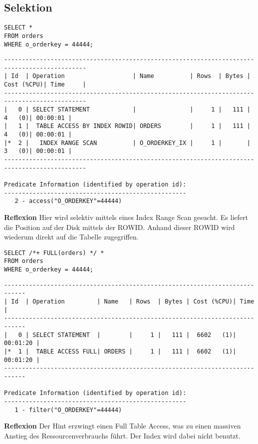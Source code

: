 \documentclass[10pt]{article}
\begin{document}
\subsection{Selektion}
\begin{lstlisting}[style=sql]
SELECT *
FROM orders
WHERE o_orderkey = 44444;
\end{lstlisting}
\begin{lstlisting}[style=queryexecutionplan]
---------------------------------------------------------------------------------------------
| Id  | Operation                   | Name          | Rows  | Bytes | Cost (%CPU)| Time     |
---------------------------------------------------------------------------------------------
|   0 | SELECT STATEMENT            |               |     1 |   111 |     4   (0)| 00:00:01 |
|   1 |  TABLE ACCESS BY INDEX ROWID| ORDERS        |     1 |   111 |     4   (0)| 00:00:01 |
|*  2 |   INDEX RANGE SCAN          | O_ORDERKEY_IX |     1 |       |     3   (0)| 00:00:01 |
---------------------------------------------------------------------------------------------

Predicate Information (identified by operation id):
---------------------------------------------------
   2 - access("O_ORDERKEY"=44444)
\end{lstlisting}
\textbf{Reflexion} \newline
Hier wird selektiv mittels eines Index Range Scan gesucht. Es liefert die Position auf der Disk mittels der ROWID. Anhand dieser ROWID wird wiederum direkt auf die Tabelle zugegriffen.

\begin{lstlisting}[style=sql]
SELECT /*+ FULL(orders) */ *
FROM orders
WHERE o_orderkey = 44444;
\end{lstlisting}
\begin{lstlisting}[style=queryexecutionplan]
----------------------------------------------------------------------------
| Id  | Operation         | Name   | Rows  | Bytes | Cost (%CPU)| Time     |
----------------------------------------------------------------------------
|   0 | SELECT STATEMENT  |        |     1 |   111 |  6602   (1)| 00:01:20 |
|*  1 |  TABLE ACCESS FULL| ORDERS |     1 |   111 |  6602   (1)| 00:01:20 |
----------------------------------------------------------------------------

Predicate Information (identified by operation id):
---------------------------------------------------
   1 - filter("O_ORDERKEY"=44444)
\end{lstlisting}
\textbf{Reflexion} \newline
Der Hint erzwingt einen Full Table Access, was zu einen massiven Anstieg des Ressourcenverbrauchs führt.
Der Index wird dabei nicht benutzt.
\end{document}
